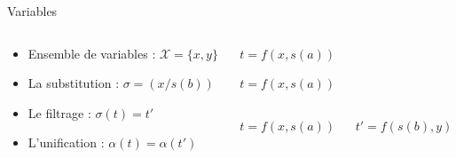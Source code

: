 \documentclass[xcolor={dvipsnames}]{beamer}
\begin{document}
\begin{frame}{Variables}
  \begin{columns}
    \begin{column}{0.6\textwidth}
      \begin{itemize}
      \item<1-> Ensemble de variables : $\mathcal X = \{x, y\}$
      \item<2-> La substitution : $\sigma = (x / s(b))$
      \item<4-> Le filtrage : $\sigma(t) = t'$
      \item<6-> L'unification : $\alpha(t) = \alpha(t')$
      \end{itemize}
    \end{column}
    \begin{column}{0.4\textwidth}
      \begin{overprint}
        \begin{center}
          $t = f(x,s(a))$\\
        \end{center}
        \begin{center}
          $t = f(x,s(a))$\\
        \end{center}
        \begin{center}
          \begin{columns}
            \begin{column}{0.5\textwidth}
              $t = f(x,s(a))$\\
            \end{column}
            \begin{column}{0.5\textwidth}
              $t' = f(s(b),y)$\\
            \end{column}
          \end{columns}
        \end{center}
      \end{overprint}
      

\end{column}
\end{columns}
\end{frame}
\end{document}
